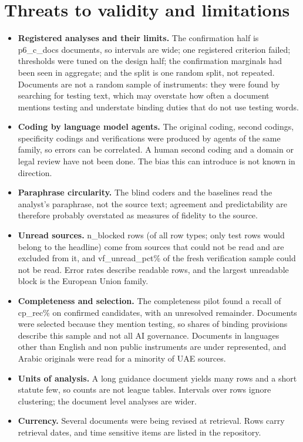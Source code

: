 \documentclass[conference]{IEEEtran}
\begin{document}
\section{Threats to validity and limitations}\label{sec:limits}
\begin{itemize}
\item \textbf{Registered analyses and their limits.} The confirmation half is {{p6_c_docs}} documents, so intervals are wide; one registered criterion failed; thresholds were tuned on the design half; the confirmation marginals had been seen in aggregate; and the split is one random split, not repeated. Documents are not a random sample of instruments: they were found by searching for testing text, which may overstate how often a document mentions testing and understate binding duties that do not use testing words.
\item \textbf{Coding by language model agents.} The original coding, second codings, specificity codings and verifications were produced by agents of the same family, so errors can be correlated. A human second coding and a domain or legal review have not been done. The bias this can introduce is not known in direction.
\item \textbf{Paraphrase circularity.} The blind coders and the baselines read the analyst's paraphrase, not the source text; agreement and predictability are therefore probably overstated as measures of fidelity to the source.
\item \textbf{Unread sources.} {{n_blocked}} rows (of all row types; only test rows would belong to the headline) come from sources that could not be read and are excluded from it, and {{vf_unread_pct}}\% of the fresh verification sample could not be read. Error rates describe readable rows, and the largest unreadable block is the European Union family.
\item \textbf{Completeness and selection.} The completeness pilot found a recall of {{cp_rec}}\% on confirmed candidates, with an unresolved remainder. Documents were selected because they mention testing, so shares of binding provisions describe this sample and not all AI governance. Documents in languages other than English and non public instruments are under represented, and Arabic originals were read for a minority of UAE sources.
\item \textbf{Units of analysis.} A long guidance document yields many rows and a short statute few, so counts are not league tables. Intervals over rows ignore clustering; the document level analyses are wider.
\item \textbf{Currency.} Several documents were being revised at retrieval. Rows carry retrieval dates, and time sensitive items are listed in the repository.

\end{itemize}
\end{document}
